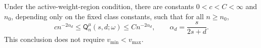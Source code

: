 Under the active-weight-region condition, there are constants \(0<c<C<\infty\) and \(n_0\), depending only on the fixed class constants, such that for all \(n\geq n_0\),
\[
c n^{-2\alpha_d}
\leq \mathsf Q_n^{\mu}(s,d;\omega)
\leq C n^{-2\alpha_d},
\qquad \alpha_d=\frac{s}{2s+d}.
\]
This conclusion does not require \(v_{\min}<v_{\max}\).